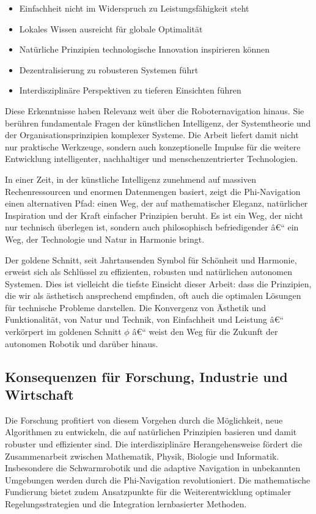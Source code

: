 ﻿\documentclass[a4paper,12pt]{article}
\theoremstyle{definition}
\begin{document}
\begin{itemize}
	\item Einfachheit nicht im Widerspruch zu Leistungsfähigkeit steht
	\item Lokales Wissen ausreicht für globale Optimalität
	\item Natürliche Prinzipien technologische Innovation inspirieren können
	\item Dezentralisierung zu robusteren Systemen führt
	\item Interdisziplinäre Perspektiven zu tieferen Einsichten führen
\end{itemize}

Diese Erkenntnisse haben Relevanz weit über die Roboternavigation hinaus. Sie berühren fundamentale Fragen der künstlichen Intelligenz, der Systemtheorie und der Organisationsprinzipien komplexer Systeme. Die Arbeit liefert damit nicht nur praktische Werkzeuge, sondern auch konzeptionelle Impulse für die weitere Entwicklung intelligenter, nachhaltiger und menschenzentrierter Technologien.

In einer Zeit, in der künstliche Intelligenz zunehmend auf massiven Rechenressourcen und enormen Datenmengen basiert, zeigt die Phi-Navigation einen alternativen Pfad: einen Weg, der auf mathematischer Eleganz, natürlicher Inspiration und der Kraft einfacher Prinzipien beruht. Es ist ein Weg, der nicht nur technisch überlegen ist, sondern auch philosophisch befriedigender â€“ ein Weg, der Technologie und Natur in Harmonie bringt.

Der goldene Schnitt, seit Jahrtausenden Symbol für Schönheit und Harmonie, erweist sich als Schlüssel zu effizienten, robusten und natürlichen autonomen Systemen. Dies ist vielleicht die tiefste Einsicht dieser Arbeit: dass die Prinzipien, die wir als ästhetisch ansprechend empfinden, oft auch die optimalen Lösungen für technische Probleme darstellen. Die Konvergenz von Ästhetik und Funktionalität, von Natur und Technik, von Einfachheit und Leistung â€“ verkörpert im goldenen Schnitt $\phi$ â€“ weist den Weg für die Zukunft der autonomen Robotik und darüber hinaus.

\subsection{Konsequenzen für Forschung, Industrie und Wirtschaft}

Die Forschung profitiert von diesem Vorgehen durch die Möglichkeit, neue Algorithmen zu entwickeln, die auf natürlichen Prinzipien basieren und damit robuster und effizienter sind. Die interdisziplinäre Herangehensweise fördert die Zusammenarbeit zwischen Mathematik, Physik, Biologie und Informatik. Insbesondere die Schwarmrobotik und die adaptive Navigation in unbekannten Umgebungen werden durch die Phi-Navigation revolutioniert. Die mathematische Fundierung bietet zudem Ansatzpunkte für die Weiterentwicklung optimaler Regelungsstrategien und die Integration lernbasierter Methoden.
\end{document}
